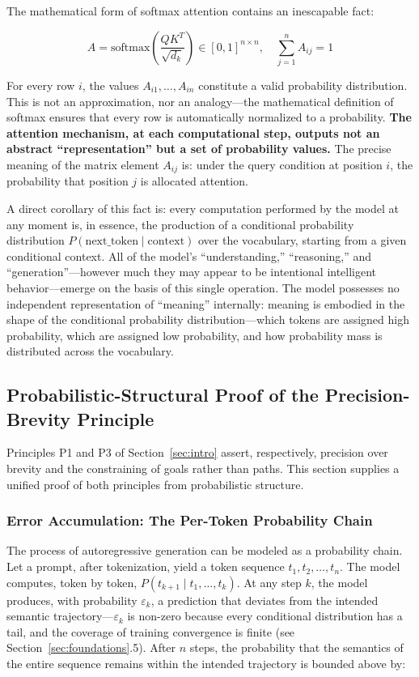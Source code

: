\documentclass[11pt,a4paper]{article}
\theoremstyle{definition}
\begin{document}
The mathematical form of softmax attention contains an inescapable fact:

\begin{equation}
A = \text{softmax}\left(\frac{QK^T}{\sqrt{d_k}}\right) \in [0,1]^{n \times n}, \quad \sum_{j=1}^n A_{ij} = 1
\end{equation}

For every row $i$, the values $A_{i1}, \ldots, A_{in}$ constitute a valid probability distribution. This is not an approximation, nor an analogy---the mathematical definition of softmax ensures that every row is automatically normalized to a probability. \textbf{The attention mechanism, at each computational step, outputs not an abstract ``representation'' but a set of probability values.} The precise meaning of the matrix element $A_{ij}$ is: under the query condition at position $i$, the probability that position $j$ is allocated attention.

A direct corollary of this fact is: every computation performed by the model at any moment is, in essence, the production of a conditional probability distribution $P(\text{next\_token} \mid \text{context})$ over the vocabulary, starting from a given conditional context. All of the model's ``understanding,'' ``reasoning,'' and ``generation''---however much they may appear to be intentional intelligent behavior---emerge on the basis of this single operation. The model possesses no independent representation of ``meaning'' internally: meaning is embodied in the shape of the conditional probability distribution---which tokens are assigned high probability, which are assigned low probability, and how probability mass is distributed across the vocabulary.

\subsection{Probabilistic-Structural Proof of the Precision-Brevity Principle}

Principles P1 and P3 of Section~\ref{sec:intro} assert, respectively, precision over brevity and the constraining of goals rather than paths. This section supplies a unified proof of both principles from probabilistic structure.

\subsubsection{Error Accumulation: The Per-Token Probability Chain}

The process of autoregressive generation can be modeled as a probability chain. Let a prompt, after tokenization, yield a token sequence $t_1, t_2, \ldots, t_n$. The model computes, token by token, $P(t_{k+1} \mid t_1, \ldots, t_k)$. At any step $k$, the model produces, with probability $\varepsilon_k$, a prediction that deviates from the intended semantic trajectory---$\varepsilon_k$ is non-zero because every conditional distribution has a tail, and the coverage of training convergence is finite (see Section~\ref{sec:foundations}.5). After $n$ steps, the probability that the semantics of the entire sequence remains within the intended trajectory is bounded above by:
\end{document}
